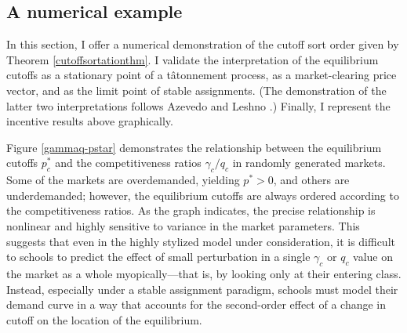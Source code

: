 \documentclass[12pt]{article}
\theoremstyle{definition}
\begin{document}
\subsection{A numerical example}
In this section, I offer a numerical demonstration of the cutoff sort order given by Theorem \ref{cutoffsortationthm}. I validate the interpretation of the equilibrium cutoffs as a stationary point of a t\^{a}tonnement process, as a market-clearing price vector, and as the limit point of stable assignments. (The demonstration of the latter two interpretations follows Azevedo and Leshno \parencite*{supplydemandfw}.) Finally, I represent the incentive results above graphically.

Figure \ref{gammaq-pstar} demonstrates the relationship between the equilibrium cutoffs $p_c^*$ and the competitiveness ratios $\gamma_c / q_c$ in randomly generated markets. Some of the markets are overdemanded, yielding $p^* > 0$, and others are underdemanded; however, the equilibrium cutoffs are always ordered according to the competitiveness ratios. As the graph indicates, the precise relationship is nonlinear and highly sensitive to variance in the market parameters. This suggests that even in the highly stylized model under consideration, it is difficult to schools to predict the effect of small perturbation in a single $\gamma_c$ or $q_c$ value on the market as a whole myopically---that is, by looking only at their entering class. Instead, especially under a stable assignment paradigm, schools must model their demand curve in a way that accounts for the second-order effect of a change in cutoff on the location of the equilibrium. %
\end{document}
